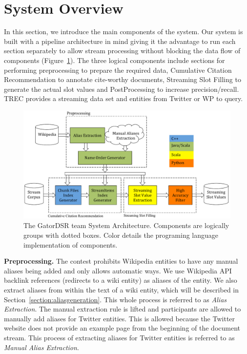 
\section{System Overview}

In this section, we introduce the main components of the system. Our system is 
built with a pipeline architecture in mind giving it the advantage to run 
each section separately to allow stream processing without blocking the data flow of components 
(Figure~\ref{fig:system}).
The three logical components include sections for performing preprocessing to prepare the required data, 
Cumulative Citation Recommendation to annotate cite-worthy documents, Streaming 
Slot Filling to generate the actual slot values and PostProcessing to 
increase precision/recall. 
TREC provides a streaming data set and  entities from Twitter or WP to query.


\begin{figure}
  \centering
  \includegraphics[width=6in]{./images/System_Diagram_Languages.pdf}
  \vspace*{-.1in} 
  \caption{The GatorDSR team System Architecture.
  Components are logically groups with dotted boxes.
  Color details the programing language implementation of components.}
  \label{fig:system}
  \vspace*{-.2in}
\end{figure}



\textbf{Preprocessing.}
\label{sec:preproc}
The contest prohibits Wikipedia entities to have any manual aliases being added and only
allows automatic ways. We use Wikipedia API backlink references
(redirects to a wiki entity) as aliases of the entity. We also extract 
aliases from within the text of a wiki entity, which will be described in
Section~\ref{section:aliasgeneration}. This whole process is referred to as
\textit{Alias Extraction}. 
The manual extraction rule is lifted and participants are allowed to manually add aliases for Twitter entities.
This is allowed because the Twitter website does not provide an example page from the beginning of the document stream.
This process of extracting
aliases for Twitter entities is referred to as \textit{Manual Alias Extraction}.

